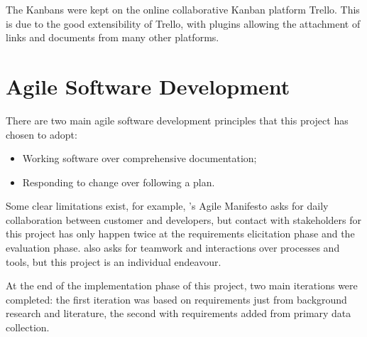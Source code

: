 The Kanbans were kept on the online collaborative Kanban platform Trello. This is due to 
the good extensibility of Trello, with plugins allowing the attachment of links and documents 
from many other platforms.

\section{Agile Software Development}

There are two main agile software development principles that this project has chosen to adopt:

\begin{itemize}
    \setlength\itemsep{0em}        
    \item Working software over comprehensive documentation;
    \item Responding to change over following a plan.   
\end{itemize}

Some clear limitations exist, for example, \citet{beck2001agile}'s Agile Manifesto asks for 
daily collaboration between customer and developers, but contact with stakeholders 
for this project has only happen twice at the requirements elicitation 
phase and the evaluation phase. \citet{beck2001agile} also asks for teamwork and 
interactions over processes and tools, but this project is an individual endeavour.

At the end of the implementation phase of this project, two main iterations were completed: 
the first iteration was based on requirements just from background research and literature, 
the second with requirements added from primary data collection.
